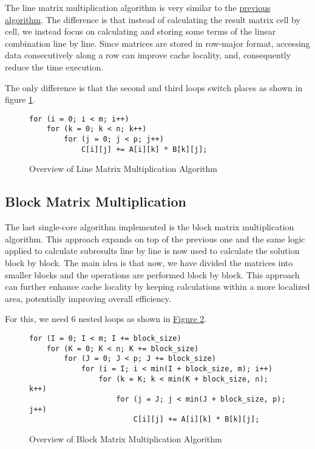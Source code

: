 The line matrix multiplication algorithm is very similar to the \hyperref[section:algorithms:naive]{previous algorithm}. The difference is that instead of calculating the result matrix cell by cell, we instead focus on calculating and storing some terms of the linear combination line by line. Since matrices are stored in row-major format, accessing data consecutively along a row can improve cache locality, and, consequently reduce the time execution.

The only difference is that the second and third loops switch places as shown in figure \ref{fig:algo:line}.

\begin{figure}[ht!]
\begin{verbatim}
for (i = 0; i < m; i++)
    for (k = 0; k < n; k++)
        for (j = 0; j < p; j++)
            C[i][j] += A[i][k] * B[k][j];
\end{verbatim}
\caption{Overview of Line Matrix Multiplication Algorithm}
\label{fig:algo:line}
\end{figure}

\subsection{Block Matrix Multiplication}

The last single-core algorithm implemented is the block matrix multiplication algorithm. This approach expands on top of the previous one and the same logic applied to calculate subresults line by line is now used to calculate the solution block by block. The main idea is that now, we have divided the matrices into smaller blocks and the operations are performed block by block. This approach can further enhance cache locality by keeping calculations within a more localized area, potentially improving overall efficiency.

For this, we need 6 nested loops as shown in \hyperref[fig:algo:block]{Figure \ref{fig:algo:block}}.

\clearpage

\begin{figure}[ht!]
\begin{verbatim}
for (I = 0; I < m; I += block_size)
    for (K = 0; K < n; K += block_size)
        for (J = 0; J < p; J += block_size)
            for (i = I; i < min(I + block_size, m); i++)
                for (k = K; k < min(K + block_size, n); k++)
                    for (j = J; j < min(J + block_size, p); j++)
                        C[i][j] += A[i][k] * B[k][j];
\end{verbatim}
\caption{Overview of Block Matrix Multiplication Algorithm}
\label{fig:algo:block}
\end{figure}

